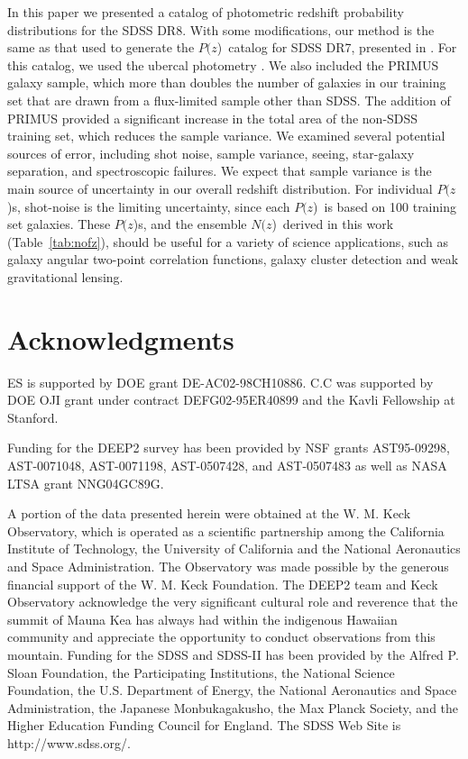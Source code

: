 \documentclass[preprint]{aastex}
\newcommand{\pofz}{$P(z$)}
\newcommand{\nofz}{$N(z$)}
\begin{document}
In this paper we presented a catalog of photometric redshift probability
distributions for the SDSS DR8.  With some modifications, our method is the
same as that used to generate the \pofz\ catalog for SDSS DR7, presented in
\cite{CunhaPhotoz09}.  For this catalog, we used the ubercal photometry
\citep{Nikhil08}.  We also included the PRIMUS galaxy sample, which more than
doubles the number of galaxies in our training set that are drawn from a
flux-limited sample other than SDSS.  The addition of PRIMUS provided a
significant increase in the total area of the non-SDSS training set, which
reduces the sample variance.  We examined several potential sources of error,
including shot noise, sample variance, seeing, star-galaxy separation, and
spectroscopic failures.  We expect that sample variance is the main source of
uncertainty in our overall redshift distribution.  For individual \pofz s,
shot-noise is the limiting uncertainty, since each \pofz\ is based on 100
training set galaxies.  These \pofz s, and the ensemble \nofz\ derived in this
work (Table~\ref{tab:nofz}), should be useful for a variety of science
applications, such as galaxy angular two-point correlation functions, galaxy
cluster detection and weak gravitational lensing.


\section*{Acknowledgments}

ES is supported by DOE grant DE-AC02-98CH10886.  C.C was supported by DOE OJI
grant under contract DEFG02-95ER40899 and the Kavli Fellowship at Stanford.

Funding for the DEEP2 survey has been provided by NSF grants AST95-09298,
AST-0071048, AST-0071198, AST-0507428, and AST-0507483 as well as NASA LTSA
grant NNG04GC89G. 

A portion of the data presented herein were obtained at the W. M. Keck
Observatory, which is operated as a scientific partnership among the California
Institute of Technology, the University of California and the National
Aeronautics and Space Administration. The Observatory was made possible by the
generous financial support of the W. M. Keck Foundation. The DEEP2 team and
Keck Observatory acknowledge the very significant cultural role and reverence
that the summit of Mauna Kea has always had within the indigenous Hawaiian
community and appreciate the opportunity to conduct observations from this
mountain.  Funding for the SDSS and SDSS-II has been provided by the Alfred P.
Sloan Foundation, the Participating Institutions, the National Science
Foundation, the U.S. Department of Energy, the National Aeronautics and Space
Administration, the Japanese Monbukagakusho, the Max Planck Society, and the
Higher Education Funding Council for England. The SDSS Web Site is
http://www.sdss.org/.
\end{document}
